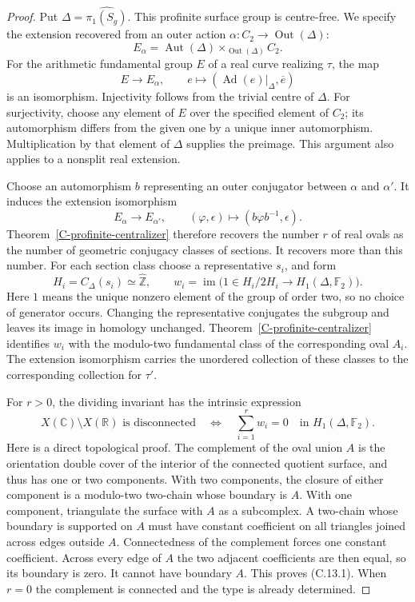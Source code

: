 \begin{proof}
Put $\Delta=\widehat{\pi_1(S_g)}$. This profinite surface group is
centre-free. We specify the extension recovered from an outer action
$\alpha:C_2\to\operatorname{Out}(\Delta)$:
\[
 E_\alpha=\operatorname{Aut}(\Delta)
       \mathbin{\times}_{\operatorname{Out}(\Delta)} C_2.
\]
For the arithmetic fundamental group $E$ of a real curve realizing
$\tau$, the map
\[
 E\longrightarrow E_\alpha,\qquad
 e\longmapsto(\operatorname{Ad}(e)|_\Delta,\overline e)
\]
is an isomorphism. Injectivity follows from the trivial centre of
$\Delta$. For surjectivity, choose any element of $E$ over the
specified element of $C_2$; its automorphism differs from the given
one by a unique inner automorphism. Multiplication by that element
of $\Delta$ supplies the preimage. This argument also applies to a
nonsplit real extension.

Choose an automorphism $b$ representing an outer conjugator between
$\alpha$ and $\alpha'$. It induces the extension isomorphism
\[
 E_\alpha\longrightarrow E_{\alpha'},\qquad
 (\varphi,\epsilon)\longmapsto
       (b\varphi b^{-1},\epsilon).
\]
Theorem~\ref{C-profinite-centralizer} therefore recovers the number
$r$ of real ovals as the number of geometric conjugacy classes of
sections. It recovers more than this number. For each section class
choose a representative $s_i$, and form
\[
 H_i=C_\Delta(s_i)\simeq\widehat{\mathbb Z},\qquad
 w_i=\operatorname{im}\bigl(
     1\in H_i/2H_i\longrightarrow H_1(\Delta,\mathbb F_2)\bigr).
\]
Here $1$ means the unique nonzero element of the group of order two,
so no choice of generator occurs. Changing the representative
conjugates the subgroup and leaves its image in homology unchanged.
Theorem~\ref{C-profinite-centralizer} identifies $w_i$ with the
modulo-two fundamental class of the corresponding oval $A_i$.
The extension isomorphism carries the unordered collection of these
classes to the corresponding collection for $\tau'$.

For $r>0$, the dividing invariant has the intrinsic expression
\[
 X(\mathbb C)\setminus X(\mathbb R)\text{ is disconnected}
 \quad\Longleftrightarrow\quad
 \sum_{i=1}^r w_i=0
       \quad\text{in }H_1(\Delta,\mathbb F_2).
\tag{C.13.1}
\]
Here is a direct topological proof. The complement of the oval union
$A$ is the orientation double cover of the interior of the connected
quotient surface, and thus has one or two components. With two
components, the closure of either component is a modulo-two
two-chain whose boundary is $A$. With one component, triangulate the
surface with $A$ as a subcomplex. A two-chain whose boundary is
supported on $A$ must have constant coefficient on all triangles
joined across edges outside $A$. Connectedness of the complement
forces one constant coefficient. Across every edge of $A$ the two
adjacent coefficients are then equal, so its boundary is zero.
It cannot have boundary $A$. This proves (C.13.1). When $r=0$ the
complement is connected and the type is already determined.


\end{proof}
